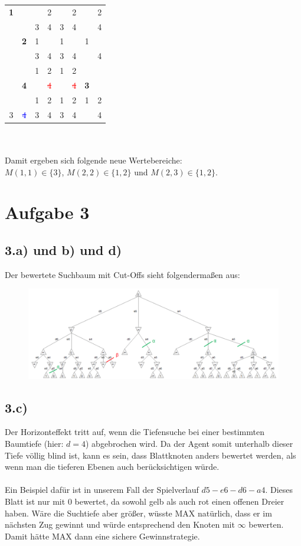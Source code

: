 \documentclass[a4paper]{article}
\begin{document}
\begin{tabular}{|cc|cc|cc|cc|}
\hline
\textbf{1}& & & 2 & & 2 & & 2\\
  & & 3 & 4 & 3 & 4 & & 4\\
\hline
 & \textbf{2} & 1 &  & 1 &  & 1 & \\
  &  & 3 & 4 & 3 & 4 &  & 4\\
\hline
&  & 1 & 2 & 1 & 2 &  & \\
  & \textbf{4} & & \textcolor{red}{\sout{4}} & & \textcolor{red}{\sout{4}} & \textbf{3} & \\
\hline
 &  & 1 & 2 & 1 & 2 & 1 & 2\\
 3 & \textcolor{blue}{\sout{4}} & 3 & 4 & 3 & 4 &  & 4\\
\hline
\end{tabular} \\
\\
Damit ergeben sich folgende neue Wertebereiche: \\
$M(1,1) \in \{ 3 \}$, $M(2,2) \in \{ 1,2 \}$ und $M(2,3) \in \{1,2\}$.


\section*{Aufgabe 3}
\subsection*{3.a) und b) und d)}
Der bewertete Suchbaum mit Cut-Offs sieht folgenderma{\ss}en aus:

\begin{figure}[h]
\centering
\includegraphics[width=\columnwidth]{blatt2aufgabe3}
\end{figure}

\subsection*{3.c)}
Der Horizonteffekt tritt auf, wenn die Tiefensuche bei einer bestimmten Baumtiefe (hier: $d=4$) abgebrochen wird. Da der Agent somit unterhalb dieser Tiefe v\"ollig blind ist, kann es sein, dass Blattknoten anders bewertet werden, als wenn man die tieferen Ebenen auch ber\"ucksichtigen w\"urde.\\
\\
Ein Beispiel daf\"ur ist in unserem Fall der Spielverlauf $d5 - e6 - d6 - a4$. Dieses Blatt ist nur mit $0$ bewertet, da sowohl gelb als auch rot einen offenen Dreier haben. W\"are die Suchtiefe aber gr\"o{\ss}er, w\"usste MAX nat\"urlich, dass er im n\"achsten Zug gewinnt und w\"urde entsprechend den Knoten mit $\infty$ bewerten. Damit h\"atte MAX dann eine sichere Gewinnstrategie.
\end{document}
